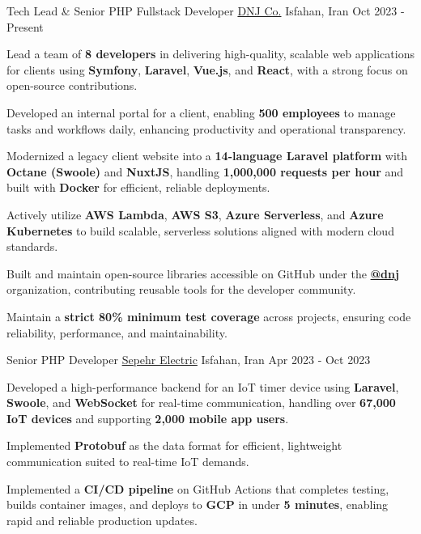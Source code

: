 
\begin{cventries}

  \cventry
    {Tech Lead \& Senior PHP Fullstack Developer} %
    {\href{https://dnj.co.ir}{DNJ Co.}} %
    {Isfahan, Iran} %
    {Oct 2023 - Present} %
    {
      \begin{cvitems}
        \item {Lead a team of \textbf{8 developers} in delivering high-quality, scalable web applications for clients using \textbf{Symfony}, \textbf{Laravel}, \textbf{Vue.js}, and \textbf{React}, with a strong focus on open-source contributions.}
        \item {Developed an internal portal for a client, enabling \textbf{500 employees} to manage tasks and workflows daily, enhancing productivity and operational transparency.}
        \item {Modernized a legacy client website into a \textbf{14-language Laravel platform} with \textbf{Octane (Swoole)} and \textbf{NuxtJS}, handling \textbf{1,000,000 requests per hour} and built with \textbf{Docker} for efficient, reliable deployments.}
        \item {Actively utilize \textbf{AWS Lambda}, \textbf{AWS S3}, \textbf{Azure Serverless}, and \textbf{Azure Kubernetes} to build scalable, serverless solutions aligned with modern cloud standards.}
        \item {Built and maintain open-source libraries accessible on GitHub under the \textbf{\href{https://github.com/dnj}{\faGithubSquare\acvHeaderIconSep @dnj}} organization, contributing reusable tools for the developer community.}
        \item {Maintain a \textbf{strict 80\% minimum test coverage} across projects, ensuring code reliability, performance, and maintainability.}
      \end{cvitems}
    }

  \cventry
    {Senior PHP Developer} %
    {\href{https://www.hinics.com/}{Sepehr Electric}} %
    {Isfahan, Iran} %
    {Apr 2023 - Oct 2023} %
    {
      \begin{cvitems}
        \item {Developed a high-performance backend for an IoT timer device using \textbf{Laravel}, \textbf{Swoole}, and \textbf{WebSocket} for real-time communication, handling over \textbf{67,000 IoT devices} and supporting \textbf{2,000 mobile app users}.}
        \item {Implemented \textbf{Protobuf} as the data format for efficient, lightweight communication suited to real-time IoT demands.}
        \item {Implemented a \textbf{CI/CD pipeline} on GitHub Actions that completes testing, builds container images, and deploys to \textbf{GCP} in under \textbf{5 minutes}, enabling rapid and reliable production updates.}
      \end{cvitems}
    }


\end{cventries}
